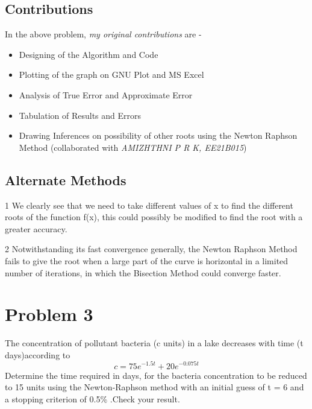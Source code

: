 \documentclass[titlepage, 11pt]{article}
\begin{document}
\inputminted[breaklines,
 mathescape,
 linenos,
 numbersep=5pt,
 frame=single,
 numbersep=5pt,
 xleftmargin=0pt]{c}{NewtonP2.c}
\label{listing:3}

\subsection{Contributions}
In the above problem, \textit{my original contributions} are - 
\begin{itemize}
    \item Designing of the Algorithm and Code
    \item Plotting of the graph on GNU Plot and MS Excel
    \item Analysis of True Error and Approximate Error
    \item Tabulation of Results and Errors
    \item Drawing Inferences on possibility of other roots using the Newton Raphson Method (collaborated with \emph{AMIZHTHNI P R K, EE21B015})
\end{itemize}

\subsection{Alternate Methods}
\item [1] We clearly see that we need to take different values of x to find the different roots of the function f(x), this could possibly be modified to find the root with a greater accuracy. \\
\item [2] Notwithstanding its fast convergence generally, the Newton Raphson Method fails to give the root when a large part of the curve is horizontal in a limited number of iterations, in which the Bisection Method could converge faster. 

\newpage
\section{Problem 3}
The concentration of pollutant bacteria (c units) in a lake decreases with time (t days)according to
\begin{equation}
    c = 75e^{-1.5t} + 20e^{−0.075t}
\end{equation}
Determine the time required in days, for the bacteria concentration to be reduced to 15 units using the Newton-Raphson method with an initial guess of t = 6 and a stopping criterion of 0.5\% .Check your result.
\end{document}
